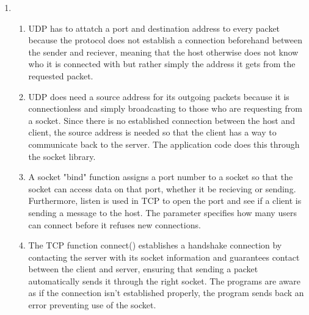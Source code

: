 \documentclass[12pt]{article}
\begin{document}
\begin{enumerate}
	\item \begin{enumerate}
			\item UDP has to attatch a port and destination address to every packet because the protocol does not establish a connection beforehand between the sender and reciever, meaning that the host otherwise does not know who it is connected with but rather simply the address it gets from the requested packet.
			\item UDP does need a source address for its outgoing packets because it is connectionless and simply broadcasting to those who are requesting from a socket. Since there is no established connection between the host and client, the source address is needed so that the client has a way to communicate back to the server. The application code does this through the socket library.
			\item A socket "bind" function assigns a port number to a socket so that the socket can access data on that port, whether it be recieving or sending. Furthermore, listen is used in TCP to open the port and see if a client is sending a message to the host. The parameter specifies how many users can connect before it refuses new connections.
			\item The TCP function connect() establishes a handshake connection by contacting the server with its socket information and guarantees contact between the client and server, ensuring that sending a packet automatically sends it through the right socket. The programs are aware as if the connection isn't established properly, the program sends back an error preventing use of the socket.
		\end{enumerate}

\end{enumerate}
\end{document}
